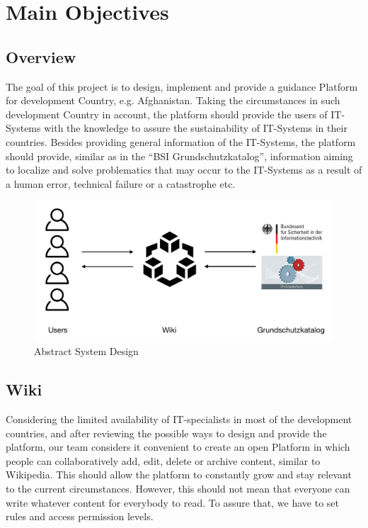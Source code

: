 \chapter{Main Objectives}
\section{Overview}
The goal of this project is to design, implement and provide a guidance Platform for development Country, e.g. Afghanistan. Taking the circumstances in such development Country in account, the platform should provide the users of IT-Systems with the knowledge to assure the sustainability of IT-Systems in their countries. Besides providing general information of the IT-Systems, the platform should provide, similar as in the “BSI Grundschutzkatalog”, information aiming to localize and solve problematics that may occur to the IT-Systems as a result of a human error, technical failure or a catastrophe etc. 
\\
\begin{figure}[h]
    \centering
    \includegraphics[scale=0.3]{Pictures/ConceptSketch}
    \caption{Abstract System Design}
\end{figure}

\section{Wiki}
Considering the limited availability of IT-specialists in most of the development countries, and after reviewing the possible ways to design and provide the platform, our team considers it convenient to create an open Platform in which people can collaboratively add, edit, delete or archive content, similar to Wikipedia. This should allow the platform to constantly grow and stay relevant to the current circumstances. However, this should not mean that everyone can write whatever content for everybody to read. To assure that, we have to set rules and access permission levels. 

